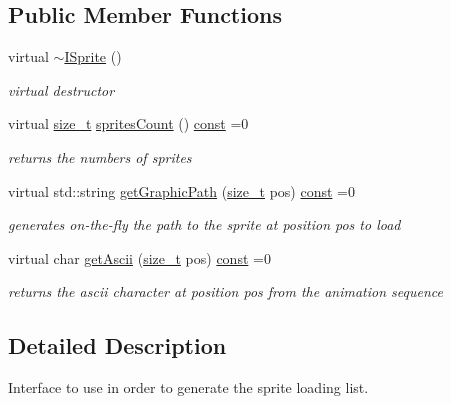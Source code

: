 \subsection*{Public Member Functions}
\begin{DoxyCompactItemize}
\item 
virtual \hyperlink{classarcade_1_1_i_sprite_aa52abc5d79f3afa9ae82696d3bf9d3d3}{$\sim$\-I\-Sprite} ()
\begin{DoxyCompactList}\small\item\em virtual destructor \end{DoxyCompactList}\item 
virtual \hyperlink{nc__alloc_8h_a7b60c5629e55e8ec87a4547dd4abced4}{size\-\_\-t} \hyperlink{classarcade_1_1_i_sprite_aa417a93a06968e42db16f8cbd2680c89}{sprites\-Count} () \hyperlink{term__entry_8h_a57bd63ce7f9a353488880e3de6692d5a}{const} =0
\begin{DoxyCompactList}\small\item\em returns the numbers of sprites \end{DoxyCompactList}\item 
virtual std\-::string \hyperlink{classarcade_1_1_i_sprite_ad47b6c128695746cd59e4b87435a7f09}{get\-Graphic\-Path} (\hyperlink{nc__alloc_8h_a7b60c5629e55e8ec87a4547dd4abced4}{size\-\_\-t} pos) \hyperlink{term__entry_8h_a57bd63ce7f9a353488880e3de6692d5a}{const} =0
\begin{DoxyCompactList}\small\item\em generates on-\/the-\/fly the path to the sprite at position pos to load \end{DoxyCompactList}\item 
virtual char \hyperlink{classarcade_1_1_i_sprite_ab9c6fec09d6a3f16d964b708b361569e}{get\-Ascii} (\hyperlink{nc__alloc_8h_a7b60c5629e55e8ec87a4547dd4abced4}{size\-\_\-t} pos) \hyperlink{term__entry_8h_a57bd63ce7f9a353488880e3de6692d5a}{const} =0
\begin{DoxyCompactList}\small\item\em returns the ascii character at position pos from the animation sequence \end{DoxyCompactList}\end{DoxyCompactItemize}


\subsection{Detailed Description}
Interface to use in order to generate the sprite loading list. 

